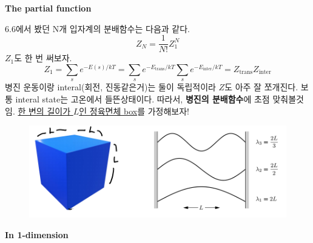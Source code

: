 \documentclass{article}
\begin{document}
\textbf{The partial function}

6.6에서 봤던 N개 입자계의 분배함수는 다음과 같다.
\begin{equation}
	Z_N = \frac{1}{N!} Z_1^N
\end{equation}
$Z_1$도 한 번 써보자.
\begin{equation}\label{eq:7-2}
	Z_1 = \sum_s e^{-E(s)/kT} = \sum_s e^{-E_{\text{trans}}/kT} \sum_s e^{-E_{\text{inter}}/kT}  = Z_{\text{trans}} Z_{\text{inter}}
\end{equation}
병진 운동이랑 interal(회전, 진동같은거)는 둘이 독립적이라 $Z$도 아주 잘 쪼개진다. 보통 interal state는 고온에서 들뜬상태이다. 따라서, \textbf{병진의 분배함수}에 초점 맞춰볼것임. \underline{한 변의 길이가 $L$인 정육면체 box}를 가정해보자!

\begin{figure}[h]
    \centering
    \includegraphics[width=0.7\linewidth]{images/fig7_1.png}
\end{figure}

\noindent
\textbf{In 1-dimension}
\end{document}
